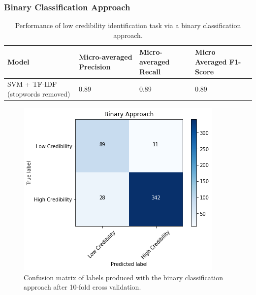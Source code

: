 \documentclass[a4paper,twoside,phd]{BYUPhys}
\begin{document}
\subsubsection{Binary Classification Approach}
\label{sec:BinaryApproachResults}

\begin{table}[H]
	\centering
	\caption{Performance of low credibility identification task via a binary classification approach.}
	\begin{tabular}{|p{2cm}|p{3.5cm}|p{3.5cm}|p{3.5cm}|}
			\hline
			
			\textbf{Model} & \textbf{Micro-averaged Precision} & \textbf{Micro-averaged Recall} & \textbf{Micro Averaged \newline F1-Score}                                                                                                                                                                                                                                                                                                                                    \\
			\hline                                                                                                                                              
			SVM + \newline TF-IDF \newline (stopwords removed) & 0.89 & 0.89 & 0.89 \\
			\hline
			
			
			
	\end{tabular}

	\label{table:BinaryApproach}
\end{table}

\begin{figure}[H]
	\centering
	\includegraphics[totalheight=7cm]{images/binary-performance.png}
	\caption{Confusion matrix of labels produced with the binary classification approach after 10-fold cross validation.}
	\label{fig:BinaryPerformance}
\end{figure}
\end{document}

